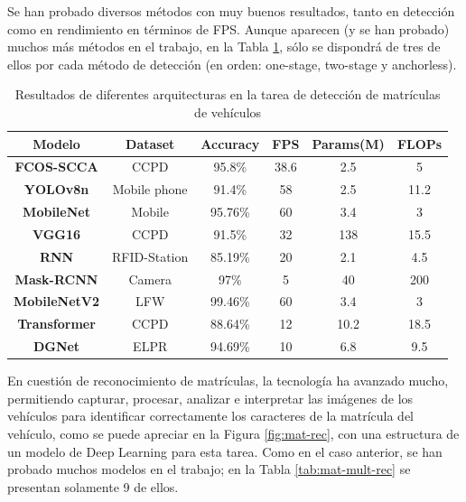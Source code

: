 \documentclass[12pt,a4paper,onecolumn,oneside]{report}
\begin{document}
Se han probado diversos métodos con muy buenos resultados, tanto en detección como en rendimiento en términos de FPS. Aunque aparecen (y se han probado) muchos más métodos en el trabajo, en la Tabla \ref{tab:mat-mult-det}, sólo se dispondrá de tres de ellos por cada método de detección (en orden: one-stage, two-stage y anchorless).

\begin{table}[htb]
    \centering
    \begin{tabular}{|c|c|c|c|c|c|}
         \hline   
         \textbf{Modelo} & \textbf{Dataset} & \textbf{Accuracy} & \textbf{FPS} & \textbf{Params(M)} & \textbf{FLOPs}\\
         \hline
         \textbf{FCOS-SCCA} & CCPD & 95.8\% & 38.6 & 2.5 & 5\\ 
         \hline
         \textbf{YOLOv8n} & Mobile phone & 91.4\% & 58 & 2.5 & 11.2\\ 
         \hline
         \textbf{MobileNet} & Mobile & 95.76\% & 60 & 3.4 & 3\\ 
         \hline
         \textbf{VGG16} & CCPD & 91.5\% & 32 & 138 & 15.5\\ 
         \hline
         \textbf{RNN} & RFID-Station & 85.19\% & 20 & 2.1 & 4.5\\ 
         \hline
         \textbf{Mask-RCNN} & Camera & 97\% & 5 & 40 & 200\\ 
         \hline
         \textbf{MobileNetV2} & LFW & 99.46\% & 60 & 3.4 & 3\\ 
         \hline
         \textbf{Transformer} & CCPD & 88.64\% & 12 & 10.2 & 18.5\\ 
         \hline
         \textbf{DGNet} & ELPR & 94.69\% & 10 & 6.8 & 9.5\\ 
         \hline
    \end{tabular}
    \caption{Resultados de diferentes arquitecturas en la tarea de detección de matrículas de vehículos}
    \label{tab:mat-mult-det}
\end{table}

En cuestión de reconocimiento de matrículas, la tecnología ha avanzado mucho, permitiendo capturar, procesar, analizar e interpretar las imágenes de los vehículos para identificar correctamente los caracteres de la matrícula del vehículo, como se puede apreciar en la Figura \ref{fig:mat-rec}, con una estructura de un modelo de Deep Learning para esta tarea. Como en el caso anterior, se han probado muchos modelos en el trabajo; en la Tabla \ref{tab:mat-mult-rec} se presentan solamente 9 de ellos. 
\end{document}
